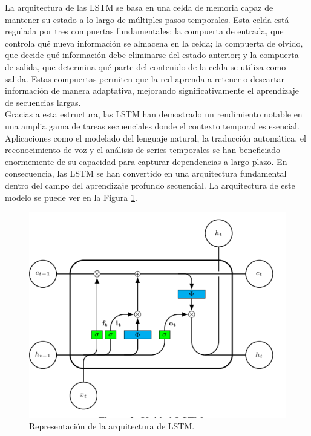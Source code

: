 La arquitectura de las LSTM se basa en una celda de memoria 
capaz de mantener su estado a lo largo de múltiples pasos 
temporales. Esta celda está regulada por tres compuertas 
fundamentales: la compuerta de entrada, que controla qué 
nueva información se almacena en la celda; la compuerta 
de olvido, que decide qué información debe eliminarse 
del estado anterior; y la compuerta de salida, que 
determina qué parte del contenido de la celda se utiliza 
como salida. Estas compuertas permiten que la red aprenda a 
retener o descartar información de manera adaptativa, mejorando 
significativamente el aprendizaje de secuencias largas.\\

Gracias a esta estructura, las LSTM han demostrado un 
rendimiento notable en una amplia gama de tareas secuenciales 
donde el contexto temporal es esencial. Aplicaciones como 
el modelado del lenguaje natural, la traducción automática, 
el reconocimiento de voz y el análisis de series temporales 
se han beneficiado enormemente de su capacidad para capturar 
dependencias a largo plazo. En consecuencia, las LSTM se han 
convertido en una arquitectura fundamental dentro del campo 
del aprendizaje profundo secuencial. La arquitectura de este 
modelo se puede ver en la Figura \ref{lstm}.

\begin{figure}[h!] 
    \includegraphics[width=1\textwidth]{images/lstm.png} 
    \centering 
    \caption[Representación de la arquitectura de LSTM.]
    {Representación de la arquitectura de LSTM\protect \cite{Orozco2021}.}
    \label{lstm} 
\end{figure}


